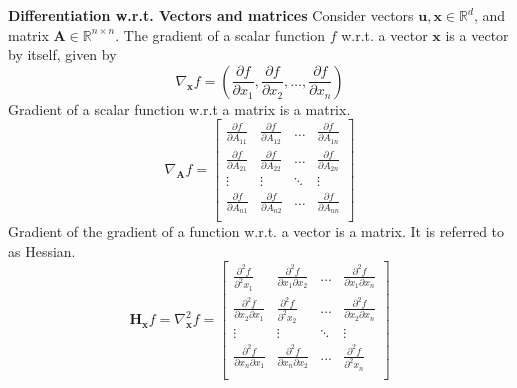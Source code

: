 \documentclass[solution,addpoints,12pt]{exam}
\begin{document}
\begin{questions}
\question \textbf{Differentiation w.r.t. Vectors and matrices}
          \newline
          Consider vectors $\boldsymbol{u, x} \in \mathbb{R}^d$, and matrix $\boldsymbol{A} \in \mathbb{R}^{n \times n}$.
          \newline
          The gradient of a scalar function $f$ w.r.t. a vector $\boldsymbol{x}$ is a vector by itself, given by
          \[
            \nabla_{\mathbf{x}} f = \left( \frac{\partial f}{\partial x_1}, \frac{\partial f}{\partial x_2}, \dots, 
                         \frac{\partial f}{\partial x_n} 
                       \right)
          \]
          Gradient of a scalar function w.r.t a matrix is a matrix. 
          \[
            \nabla_{\mathbf{A}} f = \begin{bmatrix} 
                \frac{\partial f}{\partial A_{11}} & \frac{\partial f}{\partial A_{12}} & \dots & \frac{\partial f}{\partial A_{1n}}\\
                \frac{\partial f}{\partial A_{21}} & \frac{\partial f}{\partial A_{22}} & \dots & \frac{\partial f}{\partial A_{2n}}\\
                \vdots & \vdots & \ddots & \vdots\\
                \frac{\partial f}{\partial A_{n1}} & \frac{\partial f}{\partial A_{n2}} & \dots & \frac{\partial f}{\partial A_{nn}}\\
                       \end{bmatrix}
          \]
          Gradient of the gradient of a function w.r.t. a vector is a matrix. It is referred to as Hessian. 
          \[
            \mathbf{H}_{\mathbf{x}} f = \nabla_{\mathbf{x}}^2 f = \begin{bmatrix} 
                \frac{\partial^2 f}{\partial^2 x_1} & \frac{\partial^2 f}{\partial x_1 \partial x_2} & \dots & \frac{\partial^2 f}{\partial x_1 \partial x_n}\\
                \frac{\partial^2 f}{\partial x_2  \partial x_1} & \frac{\partial^2 f}{\partial^2 x_2} & \dots & \frac{\partial^2 f}{\partial x_2 \partial x_n}\\
                \vdots & \vdots & \ddots & \vdots\\
                \frac{\partial^2 f}{\partial x_n  \partial x_1} & \frac{\partial^2 f}{\partial x_n \partial x_2} & \dots & \frac{\partial^2 f}{\partial^2 x_n}\\
                       \end{bmatrix}
          \]
          \newline
          \begin{parts}
              

\end{parts}
\end{questions}
\end{document}

